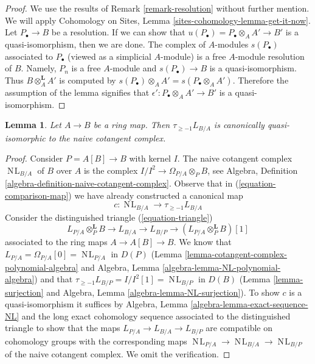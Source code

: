 \documentclass[10pt,a4paper]{amsart}
\theoremstyle{plain}
\newtheorem{lemma}[subsection]{Lemma}
\theoremstyle{definition}
\theoremstyle{remark}
\numberwithin{equation}{subsection}
\def\NL{\mathop{N\!L}\nolimits}
\begin{document}
\begin{proof}
We use the results of Remark \ref{remark-resolution} without
further mention. We will apply Cohomology on Sites, Lemma
\ref{sites-cohomology-lemma-get-it-now}. Let $P_\bullet \to B$ be a resolution.
If we can show that $u(P_\bullet) = P_\bullet \otimes_A A' \to B'$
is a quasi-isomorphism, then we are done. The complex of $A$-modules
$s(P_\bullet)$ associated to $P_\bullet$ (viewed as a simplicial $A$-module)
is a free $A$-module resolution of $B$. Namely, $P_n$ is a free $A$-module and
$s(P_\bullet) \to B$ is a quasi-isomorphism. Thus $B \otimes_A^\mathbf{L} A'$
is computed by $s(P_\bullet) \otimes_A A' = s(P_\bullet \otimes_A A')$.
Therefore the assumption of the lemma signifies that
$\epsilon' : P_\bullet \otimes_A A' \to B'$ is a quasi-isomorphism.
\end{proof}

\begin{lemma}
\label{lemma-relation-with-naive-cotangent-complex}
Let $A \to B$ be a ring map. Then $\tau_{\geq -1}L_{B/A}$
is canonically quasi-isomorphic to the naive cotangent complex.
\end{lemma}

\begin{proof}
Consider $P = A[B] \to B$ with kernel $I$. The naive cotangent
complex $\NL_{B/A}$ of $B$ over $A$ is the complex
$I/I^2 \to \Omega_{P/A} \otimes_P B$,
see Algebra, Definition \ref{algebra-definition-naive-cotangent-complex}.
Observe that in (\ref{equation-comparison-map}) we have already
constructed a canonical map
$$
c : \NL_{B/A} \longrightarrow \tau_{\geq -1}L_{B/A}
$$
Consider the distinguished triangle (\ref{equation-triangle})
$$
L_{P/A} \otimes_P^\mathbf{L} B \to L_{B/A} \to L_{B/P} \to 
(L_{P/A} \otimes_P^\mathbf{L} B)[1]
$$
associated to the ring maps $A \to A[B] \to B$. We know that
$L_{P/A} = \Omega_{P/A}[0] = \NL_{P/A}$ in $D(P)$
(Lemma \ref{lemma-cotangent-complex-polynomial-algebra}
and
Algebra, Lemma \ref{algebra-lemma-NL-polynomial-algebra})
and that
$\tau_{\geq -1}L_{B/P} = I/I^2[1] = \NL_{B/P}$ in $D(B)$
(Lemma \ref{lemma-surjection} and
Algebra, Lemma \ref{algebra-lemma-NL-surjection}).
To show $c$ is a quasi-isomorphism it suffices by
Algebra, Lemma \ref{algebra-lemma-exact-sequence-NL}
and the long exact cohomology sequence associated to the
distinguished triangle
to show that the maps $L_{P/A} \to L_{B/A} \to L_{B/P}$ are compatible
on cohomology groups with the corresponding maps
$\NL_{P/A} \to \NL_{B/A} \to \NL_{B/P}$
of the naive cotangent complex. We omit the verification.
\end{proof}
\end{document}
